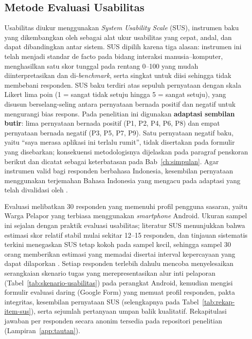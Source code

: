 \subsection{Metode Evaluasi Usabilitas}
\label{sec:metode-usabilitas}

Usabilitas diukur menggunakan \textit{System Usability Scale} (SUS), instrumen baku yang dikembangkan oleh \citet{brookeSUSQuick1996} sebagai alat ukur usabilitas yang cepat, andal, dan dapat dibandingkan antar sistem. SUS dipilih karena tiga alasan: instrumen ini telah menjadi standar de facto pada bidang interaksi manusia--komputer, menghasilkan satu skor tunggal pada rentang 0--100 yang mudah diinterpretasikan dan di-\textit{benchmark}, serta singkat untuk diisi sehingga tidak membebani responden. SUS baku terdiri atas sepuluh pernyataan dengan skala Likert lima poin (1 = sangat tidak setuju hingga 5 = sangat setuju), yang disusun berselang-seling antara pernyataan bernada positif dan negatif untuk mengurangi bias respons. Pada penelitian ini digunakan \textbf{adaptasi sembilan butir}: lima pernyataan bernada positif (P1, P2, P4, P6, P8) dan empat pernyataan bernada negatif (P3, P5, P7, P9). Satu pernyataan negatif baku, yaitu ``saya merasa aplikasi ini terlalu rumit'', tidak disertakan pada formulir yang disebarkan; konsekuensi metodologisnya dijelaskan pada paragraf penskoran berikut dan dicatat sebagai keterbatasan pada Bab~\ref{ch:simpulan}. Agar instrumen valid bagi responden berbahasa Indonesia, kesembilan pernyataan menggunakan terjemahan Bahasa Indonesia yang mengacu pada adaptasi yang telah divalidasi oleh \citet{sharfinaIndonesianAdaptationSystem2016}.

Evaluasi melibatkan 30 responden yang memenuhi profil pengguna sasaran, yaitu Warga Pelapor yang terbiasa menggunakan \textit{smartphone} Android. Ukuran sampel ini sejalan dengan praktik evaluasi usabilitas; literatur SUS menunjukkan bahwa estimasi skor relatif stabil mulai sekitar 12--15 responden, dan tinjauan sistematis terkini menegaskan SUS tetap kokoh pada sampel kecil, sehingga sampel 30 orang memberikan estimasi yang memadai disertai interval kepercayaan yang dapat dilaporkan \citep{lewisSauroPastPresent2018, vlachogianniTseliosPerceivedUsability2022}. Setiap responden terlebih dahulu mencoba menyelesaikan serangkaian skenario tugas yang merepresentasikan alur inti pelaporan (Tabel~\ref{tab:skenario-usabilitas}) pada perangkat Android, kemudian mengisi formulir evaluasi daring (Google Form) yang memuat profil responden, pakta integritas, kesembilan pernyataan SUS (selengkapnya pada Tabel~\ref{tab:rekap-item-sus}), serta sejumlah pertanyaan umpan balik kualitatif. Rekapitulasi jawaban per responden secara anonim tersedia pada repositori penelitian (Lampiran~\ref{app:tautan}).

